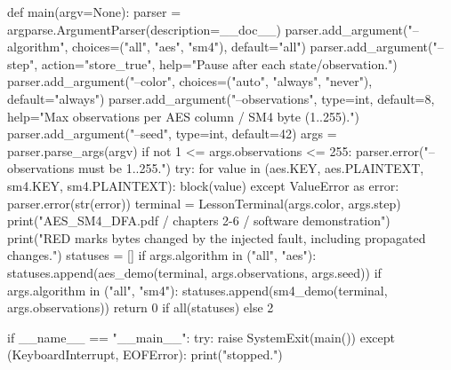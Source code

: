 \begin{lightcode}[numbers=left,firstnumber=1]
def main(argv=None):
    parser = argparse.ArgumentParser(description=__doc__)
    parser.add_argument("--algorithm", choices=("all", "aes", "sm4"), default="all")
    parser.add_argument("--step", action="store_true", help="Pause after each state/observation.")
    parser.add_argument("--color", choices=("auto", "always", "never"), default="always")
    parser.add_argument("--observations", type=int, default=8, help="Max observations per AES column / SM4 byte (1..255).")
    parser.add_argument("--seed", type=int, default=42)
    args = parser.parse_args(argv)
    if not 1 <= args.observations <= 255:
        parser.error("--observations must be 1..255.")
    try:
        for value in (aes.KEY, aes.PLAINTEXT, sm4.KEY, sm4.PLAINTEXT):
            block(value)
    except ValueError as error:
        parser.error(str(error))
    terminal = LessonTerminal(args.color, args.step)
    print("AES_SM4_DFA.pdf / chapters 2-6 / software demonstration")
    print("RED marks bytes changed by the injected fault, including propagated changes.")
    statuses = []
    if args.algorithm in ("all", "aes"):
        statuses.append(aes_demo(terminal, args.observations, args.seed))
    if args.algorithm in ("all", "sm4"):
        statuses.append(sm4_demo(terminal, args.observations))
    return 0 if all(statuses) else 2


if __name__ == "__main__":
    try:
        raise SystemExit(main())
    except (KeyboardInterrupt, EOFError):
        print("\nLesson stopped.")
\end{lightcode}
